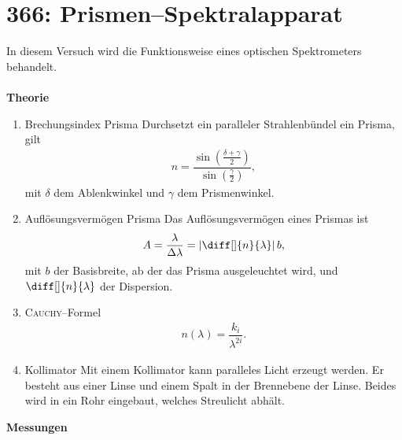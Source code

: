 \section{366: Prismen--Spektralapparat}
In diesem Versuch wird die Funktionsweise eines optischen Spektrometers behandelt.\\\\
\textbf{Theorie} 
\begin{enumerate}[label=--]
        \item Brechungsindex Prisma \hspace{25pt}
                Durchsetzt ein paralleler Strahlenbündel ein Prisma, gilt
                \begin{align} 
                        n=\dfrac{\sin \left(\tfrac{\delta +\gamma }{2}\right)}{\sin \left(\tfrac{\gamma }{2}\right)}
                ,\end{align} 
                mit $\delta $ dem Ablenkwinkel und $\gamma $ dem Prismenwinkel.
        \item Auflösungsvermögen Prisma \hspace{25pt}
                Das Auflösungsvermögen eines Prismas ist
                \begin{align} 
                A=\dfrac{\lambda }{\Delta \lambda }=\left|\diff[]{n}{\lambda }\right|b
                ,\end{align} 
                mit $b$ der Basisbreite, ab der das Prisma ausgeleuchtet wird, und $\diff[]{n}{\lambda }$ der Dispersion.
        \item \textsc{Cauchy}--Formel \hspace{25pt}
                \begin{align} 
                        n\left(\lambda \right)=\dfrac{k_i}{\lambda ^{2i}}
                .\end{align} 
        \item Kollimator \hspace{25pt}
                Mit einem Kollimator kann paralleles Licht erzeugt werden.
                Er besteht aus einer Linse und einem Spalt in der Brennebene der Linse.
                Beides wird in ein Rohr eingebaut, welches Streulicht abhält.
\end{enumerate}
\textbf{Messungen} 
